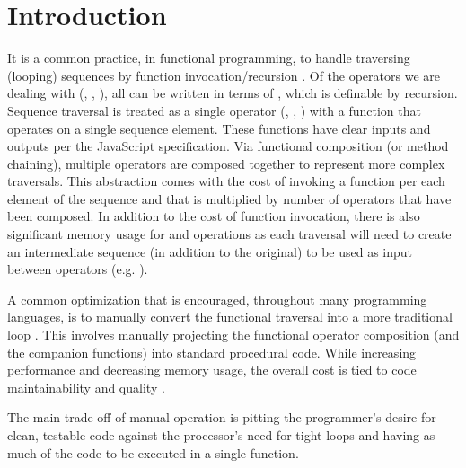 \chapter{Introduction}
It is a common practice, in functional programming, to handle traversing (looping) sequences by function invocation/recursion \cite{recurse16}.  Of the operators we are dealing with (, , ), all can be written in terms of , which is definable by recursion. Sequence traversal is treated as a single operator (, , ) with a function that operates on a single sequence element. These functions have clear inputs and outputs per the JavaScript specification.  Via functional composition (or method chaining), multiple operators are composed together to represent more complex traversals.  This abstraction comes with the cost of invoking a function per each element of the sequence and that is multiplied by number of operators that have been composed. In addition to the cost of function invocation, there is also significant memory usage for  and  operations as each traversal will need to create an intermediate sequence (in addition to the original) to be used as input between operators (e.g. ).  

A common optimization that is encouraged, throughout many programming languages, is to manually convert the functional traversal into a more traditional  loop \cite{iterperf09} \cite{iterperf10} \cite{iterperf11}.  This involves manually projecting the functional operator composition (and the companion functions) into standard procedural code.  While increasing performance and decreasing memory usage, the overall cost is tied to code maintainability and quality \cite{langstudy14}.  

The main trade-off of manual operation is pitting the programmer's desire for clean, testable code against the processor's need for tight loops and having as much of the code to be executed in a single function.  